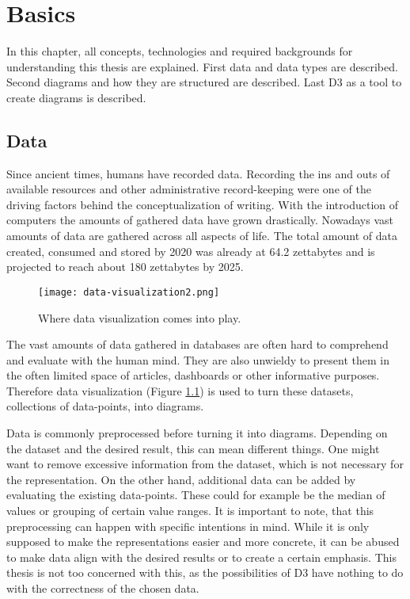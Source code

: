 \chapter{Basics}

In this chapter, all concepts, technologies and required backgrounds for understanding this thesis are explained. First data and data types are described. Second diagrams and how they are structured are described. Last D3 as a tool to create diagrams is described.


\section{Data}

Since ancient times, humans have recorded data. Recording the ins and outs of available resources and other administrative record-keeping were one of the driving factors behind the conceptualization of writing\cite{senner1991origins}.
With the introduction of computers the amounts of gathered data have grown drastically. Nowadays vast amounts of data are gathered across all aspects of life. The total amount of data created, consumed and stored by 2020 was already at 64.2 zettabytes and is projected to reach about 180 zettabytes by 2025\cite{statista_2022}.

\begin{figure}
    \label{fig:data-visualization}
    \texttt{[image: data-visualization2.png]}
    \caption[data-visualization]{Where data visualization comes into play.}
\end{figure}

The vast amounts of data gathered in databases are often hard to comprehend and evaluate with the human mind. They are also unwieldy to present them in the often limited space of articles, dashboards or other informative purposes. Therefore data visualization (Figure \ref{fig:data-visualization}) is used to turn these datasets, collections of data-points, into diagrams.

Data is commonly preprocessed before turning it into diagrams. Depending on the dataset and the desired result, this can mean different things. One might want to remove excessive information from the dataset, which is not necessary for the representation. On the other hand, additional data can be added by evaluating the existing data-points. These could for example be the median of values or grouping of certain value ranges\cite{garcia2015data}. It is important to note, that this preprocessing can happen with specific intentions in mind. While it is only supposed to make the representations easier and more concrete, it can be abused to make data align with the desired results or to create a certain emphasis. This thesis is not too concerned with this, as the possibilities of D3 have nothing to do with the correctness of the chosen data.

